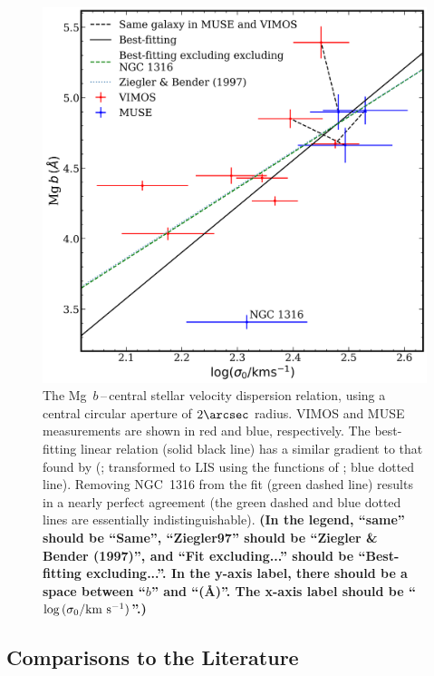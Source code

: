 \documentclass[a4paper,fleqn,usenatbib]{mnras}
\begin{document}
\begin{figure}
  \includegraphics[width=\columnwidth]{Mg_sigma.png}
  \caption[Global Mg\,b\,--\,$\sigma$]{The Mg~$b$\,--\,central stellar
    velocity dispersion relation, using a central circular aperture of
    $2\arcsec$ radius. VIMOS and MUSE measurements are shown in red
    and blue, respectively. The best-fitting linear relation (solid
    black line) has a similar gradient to that found by
    \citeauthor{Ziegler1997} (\citeyear{Ziegler1997}; transformed to
    LIS using the functions of \citealt{Vazdekis2010}; blue dotted
    line). Removing NGC~1316 from the fit (green dashed line) results
    in a nearly perfect agreement (the green dashed and blue dotted
    lines are essentially indistinguishable). {\bf (In the legend,
      ``same'' should be ``Same'', ``Ziegler97'' should be ``Ziegler
      \& Bender (1997)'', and ``Fit excluding...'' should be
      ``Best-fitting excluding...''. In the y-axis label, there should
      be a space between ``$b$'' and ``(\AA)''. The x-axis label
      should be ``$\log\,(\sigma_0/{\rm km~s^{-1}})$''.)}}
  \label{fig:globalMg}
\end{figure}

\subsection{Comparisons to the Literature}
\label{subsec:Lit}
\end{document}
